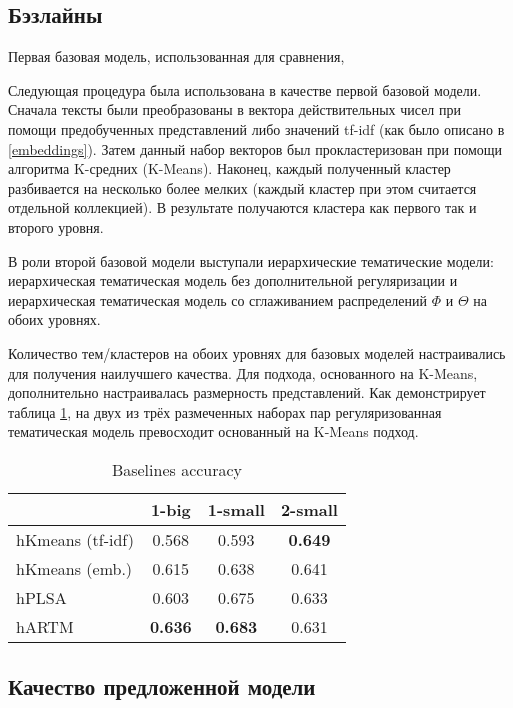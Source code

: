 \subsection{Бэзлайны}
Первая базовая модель, использованная для сравнения, 

Следующая процедура была использована в качестве первой базовой модели. Сначала тексты были преобразованы в вектора действительных чисел при помощи предобученных представлений либо значений tf-idf (как было описано в \ref{embeddings}). Затем данный набор векторов был прокластеризован при помощи алгоритма K-средних (K-Means). Наконец, каждый полученный кластер разбивается на несколько более мелких (каждый кластер при этом считается отдельной коллекцией). В результате получаются кластера как первого так и второго уровня.

В роли второй базовой модели выступали иерархические тематические модели: иерархическая тематическая модель без дополнительной регуляризации и иерархическая тематическая модель со сглаживанием распределений  $\Phi$ и $\Theta$ на обоих уровнях.

Количество тем/кластеров на обоих уровнях для базовых моделей настраивались для получения наилучшего качества. Для подхода, основанного на K-Means, дополнительно настраивалась размерность представлений. Как демонстрирует таблица  \ref{baselines}, на двух из трёх размеченных наборах пар регуляризованная тематическая модель превосходит основанный на K-Means подход.

\begin{table}[!h]
    \centering
\begin{tabular}{p{2.7cm}|c|c|c}
    \hline
    & 1-big           & 1-small            & 2-small            \\ \hline
    hKmeans (tf-idf)      & 0.568          & 0.593          & \textbf{0.649} \\
    hKmeans (emb.) & 0.615          & 0.638          & 0.641          \\
    hPLSA         & 0.603          & 0.675          & 0.633          \\
    hARTM         & \textbf{0.636} & \textbf{0.683} & 0.631          \\  \hline 
\end{tabular}
    \caption{Baselines accuracy}
    \label{baselines}
\end{table}

\subsection{Качество предложенной модели}

